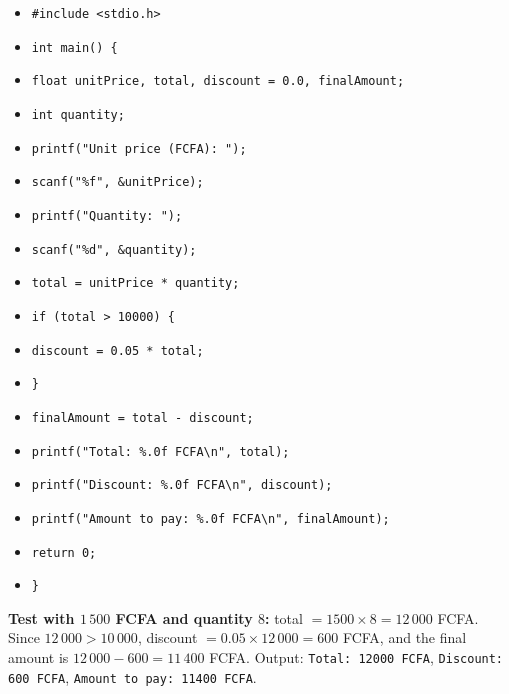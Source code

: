 \documentclass[11pt]{article}
\begin{document}
\begin{corrige}
\begin{itemize}
\item \texttt{\#include <stdio.h>}
\item \texttt{int main() \{}
\item \texttt{\quad float unitPrice, total, discount = 0.0, finalAmount;}
\item \texttt{\quad int quantity;}
\item \texttt{\quad printf("Unit price (FCFA): ");}
\item \texttt{\quad scanf("\%f", \&unitPrice);}
\item \texttt{\quad printf("Quantity: ");}
\item \texttt{\quad scanf("\%d", \&quantity);}
\item \texttt{\quad total = unitPrice * quantity;}
\item \texttt{\quad if (total > 10000) \{}
\item \texttt{\quad\quad discount = 0.05 * total;}
\item \texttt{\quad \}}
\item \texttt{\quad finalAmount = total - discount;}
\item \texttt{\quad printf("Total: \%.0f FCFA\textbackslash n", total);}
\item \texttt{\quad printf("Discount: \%.0f FCFA\textbackslash n", discount);}
\item \texttt{\quad printf("Amount to pay: \%.0f FCFA\textbackslash n", finalAmount);}
\item \texttt{\quad return 0;}
\item \texttt{\}}
\end{itemize}
\textbf{Test with $1\,500$ FCFA and quantity $8$:} total $= 1500 \times 8 = 12\,000$ FCFA. Since $12\,000 > 10\,000$, discount $= 0.05 \times 12\,000 = 600$ FCFA, and the final amount is $12\,000 - 600 = 11\,400$ FCFA. Output: \texttt{Total: 12000 FCFA}, \texttt{Discount: 600 FCFA}, \texttt{Amount to pay: 11400 FCFA}.
\end{corrige}
\end{document}
